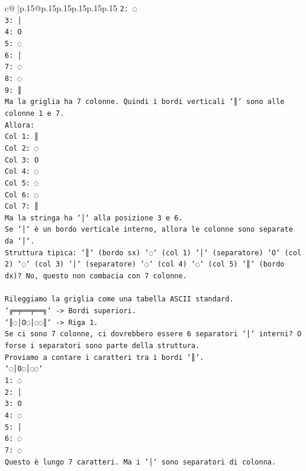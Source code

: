 \documentclass{article}
\begin{document}
{\begin{supertabular}{c@{$\;$}|p{.15\linewidth}@{}p{.15\linewidth}p{.15\linewidth}p{.15\linewidth}p{.15\linewidth}p{.15\linewidth}}
{{{\texttt{2: ◌} \\
\texttt{3: │} \\
\texttt{4: O} \\
\texttt{5: ◌} \\
\texttt{6: │} \\
\texttt{7: ◌} \\
\texttt{8: ◌} \\
\texttt{9: ║} \\
\texttt{Ma la griglia ha 7 colonne. Quindi i bordi verticali `║` sono alle colonne 1 e 7.} \\
\texttt{Allora:} \\
\texttt{Col 1: ║} \\
\texttt{Col 2: ◌} \\
\texttt{Col 3: O} \\
\texttt{Col 4: ◌} \\
\texttt{Col 5: ◌} \\
\texttt{Col 6: ◌} \\
\texttt{Col 7: ║} \\
\texttt{Ma la stringa ha `│` alla posizione 3 e 6.} \\
\texttt{Se `│` è un bordo verticale interno, allora le colonne sono separate da `│`.} \\
\texttt{Struttura tipica: `║` (bordo sx) `◌` (col 1) `│` (separatore) `O` (col 2) `◌` (col 3) `│` (separatore) `◌` (col 4) `◌` (col 5) `║` (bordo dx)? No, questo non combacia con 7 colonne.} \\
\\ 
\texttt{Rileggiamo la griglia come una tabella ASCII standard.} \\
\texttt{`╔═╤══╤══╗` {-}> Bordi superiori.} \\
\texttt{`║◌│O◌│◌◌║` {-}> Riga 1.} \\
\texttt{Se ci sono 7 colonne, ci dovrebbero essere 6 separatori `│` interni? O forse i separatori sono parte della struttura.} \\
\texttt{Proviamo a contare i caratteri tra i bordi `║`.} \\
\texttt{`◌│O◌│◌◌`} \\
\texttt{1: ◌} \\
\texttt{2: │} \\
\texttt{3: O} \\
\texttt{4: ◌} \\
\texttt{5: │} \\
\texttt{6: ◌} \\
\texttt{7: ◌} \\
\texttt{Questo è lungo 7 caratteri. Ma i `│` sono separatori di colonna.} \\
}}}
\end{supertabular}}
\end{document}
